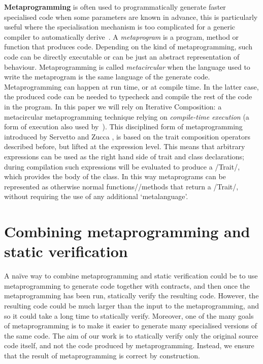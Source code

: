 \textbf{Metaprogramming} is often used to programmatically generate faster specialised code when some parameters are known in advance, this is particularly useful where the specialisation mechanism is too complicated for a generic compiler to automatically derive~\cite{Ofenbeck:2017:SGP:3136040.3136060}.
A \emph{metaprogram} is a program, method or function 
that produces code. Depending on the kind of metaprogramming, such code can be directly executable or can be just an abstract representation of behaviour.
Metaprogramming is called \emph{metacircular} when the language used to write the metaprogram is the same language of the generate code.
Metaprogramming can happen at run time, or at compile time. In the latter case, the produced code can be needed to typecheck and compile the rest of the code in the program.
In this paper we will rely on 
Iterative Composition: 
a metacircular metaprogramming technique relying on \emph{compile-time execution} (a form of execution also used by~\cite{sheard2002template}).
This disciplined form of metaprogramming introduced by Servetto and Zucca \cite{servetto2014meta}, is based on the trait composition operators described before, but lifted at the expression level.
This means that arbitrary expressions can be used as the right hand side of trait and class declarations; during compilation such expressions will be evaluated to produce a /Trait/, which provides the body of the class. In this way metaprograms can be represented as otherwise normal functions//methods that return a /Trait/, without requiring the use of any additional `metalanguage'.

\section{Combining metaprogramming and static verification}

A na\"ive way to combine metaprogramming and static verification could be to use metaprogramming to generate code together with contracts, and then once the metaprogramming has been run,
statically verify the resulting code. 
However, the resulting code could be much larger than the input to the metaprogramming, and so it could take a long time to statically verify.
Moreover, one of the many goals of metaprogramming is to make it easier to generate many specialised versions of the same  code.
The aim of our work is to statically verify only the original source code itself, and not the code produced by metaprogramming.
Instead, we
ensure that the result of metaprogramming is correct by construction.

